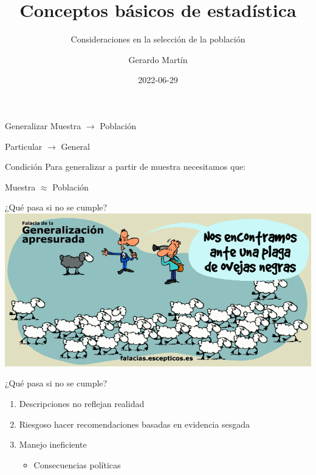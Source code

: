 \documentclass[
  11pt,
  ignorenonframetext,
]{beamer}
\title{Conceptos básicos de estadística}
\subtitle{Consideraciones en la selección de la población}
\author{Gerardo Martín}
\date{2022-06-29}
\providecommand{\tightlist}{%
  \setlength{\itemsep}{0pt}\setlength{\parskip}{0pt}}
\begin{document}
\frame{\titlepage}

\begin{frame}{Generalizar}
\protect\hypertarget{generalizar}{}
Muestra \(\rightarrow\) Población

Particular \(\rightarrow\) General
\end{frame}

\begin{frame}{Condición}
\protect\hypertarget{condiciuxf3n}{}
Para generalizar a partir de muestra necesitamos que:

Muestra \(\approx\) Población
\end{frame}

\begin{frame}{¿Qué pasa si no se cumple?}
\protect\hypertarget{quuxe9-pasa-si-no-se-cumple}{}
\includegraphics{Figuras-poblacion/Sesgo.png}
\end{frame}

\begin{frame}{¿Qué pasa si no se cumple?}
\protect\hypertarget{quuxe9-pasa-si-no-se-cumple-1}{}
\begin{enumerate}
\item
  Descripciones no reflejan realidad
\item
  Riesgoso hacer recomendaciones basadas en evidencia sesgada
\item
  Manejo ineficiente

  \begin{itemize}
  \tightlist
  \item
    Consecuencias políticas
  \end{itemize}
\end{enumerate}
\end{frame}
\end{document}
